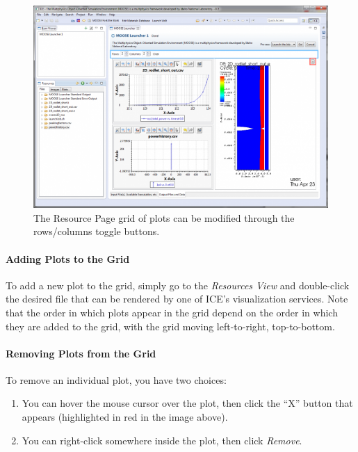 \begin{figure}[htbp]
\centering
\includegraphics[width=\textwidth]{figures/ICE_Viz_Grid.png}
\caption{The Resource Page grid of plots can be modified through the rows/columns toggle buttons.}
\end{figure}

\paragraph{Adding Plots to the Grid}\label{adding-plots-to-the-grid}

To add a new plot to the grid, simply go to the \emph{Resources View}
and double-click the desired file that can be rendered by one of ICE's
visualization services. Note that the order in which plots appear in the
grid depend on the order in which they are added to the grid, with the
grid moving left-to-right, top-to-bottom.

\paragraph{Removing Plots from the
Grid}\label{removing-plots-from-the-grid}

To remove an individual plot, you have two choices:

\begin{enumerate}
\itemsep1pt\parskip0pt
\item
  You can hover the mouse cursor over the plot, then click the ``X''
  button that appears (highlighted in red in the image above).
\item
  You can right-click somewhere inside the plot, then click
  \emph{Remove}.
\end{enumerate}

